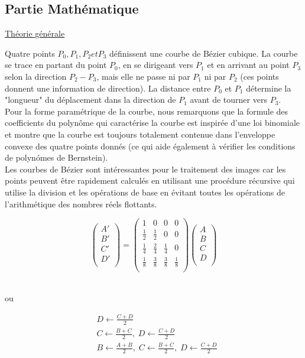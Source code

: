 \documentclass{article}
\begin{document}
\newpage
\subsection{Partie Math\'{e}matique}

\begingroup\raggedleft
\underline{Th\'{e}orie g\'{e}n\'{e}rale}
\endgroup
\par
Quatre points $P_0 , P_1 , P_2 et P_3$ d\'{e}finissent une courbe de B\'{e}zier cubique. La courbe se trace en partant du point $P_0$, en se dirigeant vers $P_1$ et en arrivant au point $P_3$ selon la direction $P_2-P_3$, mais elle ne passe ni par $P_1$ ni par $P_2$ (ces points donnent une information de direction). La distance entre $P_0$ et $P_1$ d\'{e}termine la "longueur" du d\'{e}placement dans la direction de $P_1$ avant de tourner vers $P_3$.
\\
\indent
    Pour la forme param\'{e}trique de la courbe, nous remarquons que la formule des coefficients du polyn\^{o}me qui caract\'{e}rise la courbe est inspirée d'une loi binomiale et montre que la courbe est toujours totalement contenue dans l'enveloppe convexe des quatre points donn\'{e}s (ce qui aide \'{e}galement \`{a} v\'{e}rifier les conditions de polyn\'{o}mes de Bernstein).
\\
\indent
    Les courbes de B\'{e}zier sont int\'{e}ressantes pour le traitement des images car les points peuvent \^{e}tre rapidement calcul\'{e}s en utilisant une proc\'{e}dure r\'{e}cursive qui utilise la division et les op\'{e}rations de base en \'{e}vitant toutes les opérations de l'arithm\'{e}tique des nombres r\'{e}els flottants.


\[\begin{pmatrix}
A' \\
B' \\
C' \\ 
D'\\
\end{pmatrix}
=
\begin{pmatrix}
1 & 0 & 0 & 0 \\[5pt]
\frac{1}{2} & \frac{1}{2} & 0 & 0 \\[5pt]
\frac{1}{4} & \frac{2}{4} & \frac{1}{4} & 0 \\[5pt]
\frac{1}{8} & \frac{3}{8} & \frac{3}{8} & \frac{1}{8} \\[5pt]
\end{pmatrix}
\begin{pmatrix}
A \\
B \\
C \\ 
D \\
\end{pmatrix}\]
\\
\centerline{ou}
\begin{align*}
& D \leftarrow \frac{C+D}{2}
\\[5pt]
& C \leftarrow \frac{B+C}{2}, \; D \leftarrow \frac{C+D}{2}
\\[5pt]
& B \leftarrow \frac{A+B}{2}, \; C \leftarrow \frac{B+C}{2}, \; D \leftarrow \frac{C+D}{2}
\end{align*}
\end{document}
